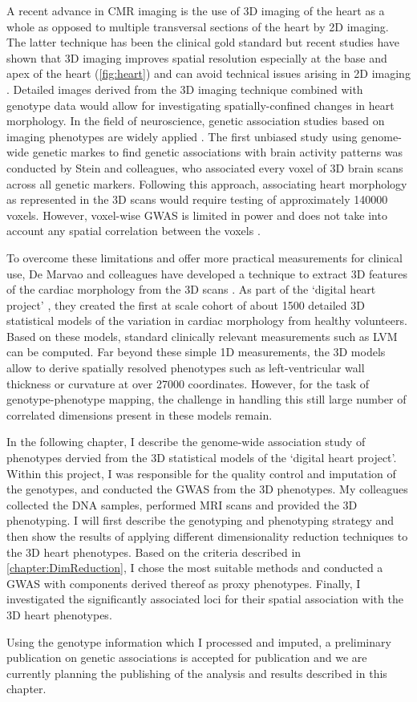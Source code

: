A recent advance in CMR imaging is the use of 3D imaging of the heart as a whole as opposed to multiple transversal sections of the heart by 2D imaging. The latter technique has been the clinical gold standard but recent studies have shown that 3D imaging improves spatial resolution especially at the base and apex of the heart (\cref{fig:heart}) and can avoid technical issues arising in 2D imaging \citep{deMarvao2104}. Detailed images derived from the 3D imaging technique combined with genotype data would allow for investigating spatially-confined changes in heart morphology. In the field of neuroscience,  genetic association studies based on imaging phenotypes are widely applied \citep{Filippini2009,Jhanshad2013,Ho2014,Hibar2015}. The first unbiased study using genome-wide genetic markes to find genetic associations with brain activity patterns was conducted by Stein and colleagues, who associated every voxel of 3D brain scans across all genetic markers. Following this approach, associating heart morphology as represented in the 3D scans would require testing of approximately \num{140000} voxels. However, voxel-wise GWAS is limited in power and does not take into account any spatial correlation between the voxels \citep{Ge2014}. 

To overcome these limitations and offer more practical measurements for clinical use, De Marvao and colleagues have developed a technique to extract 3D features of the cardiac morphology from the 3D scans \citep{DeMarvao2014}. As part of the `digital heart project' \citep{Digitalheart}, they created the first at scale cohort of about \num{1500} detailed 3D statistical models of the variation in cardiac morphology from healthy volunteers. Based on these models, standard clinically relevant measurements such as LVM can be computed. Far beyond these simple 1D measurements, the 3D models allow to derive spatially resolved phenotypes such as left-ventricular wall thickness or curvature at over \num{27000} coordinates. However, for the task of genotype-phenotype mapping, the challenge in handling this still large number of correlated dimensions present in these models remain.

In the following chapter, I describe the genome-wide association study of phenotypes dervied from the 3D statistical models of the `digital heart project'. Within this project, I was responsible for the quality control and imputation of the genotypes, and conducted the GWAS from the 3D phenotypes. My colleagues collected the DNA samples, performed MRI scans and provided the 3D phenotyping. I will first describe the genotyping and phenotyping strategy and then show the results of applying different dimensionality reduction techniques to the 3D heart phenotypes. Based on the criteria described in \cref{chapter:DimReduction}, I chose the most suitable methods and conducted a GWAS with components derived thereof as proxy phenotypes. Finally, I investigated the significantly associated loci for their spatial association with the 3D heart phenotypes.

Using the genotype information which I processed and imputed, a preliminary publication on genetic associations is accepted for publication \citep{Biffi2017} and we are currently planning the publishing of the analysis and results described in this chapter.


